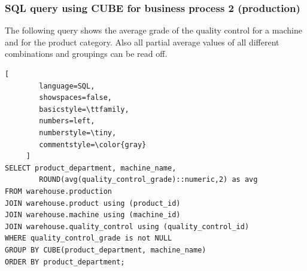 \documentclass[letterpaper,12pt]{article}
\begin{document}
\subsubsection{SQL query using CUBE for business process 2 (production)}

The following query shows the average grade of the quality control for a machine and for the product category. Also all partial average values of all different combinations and groupings can be read off.

\begin{lstlisting}[
        language=SQL,
        showspaces=false,
        basicstyle=\ttfamily,
        numbers=left,
        numberstyle=\tiny,
        commentstyle=\color{gray}
     ]
SELECT product_department, machine_name, 
        ROUND(avg(quality_control_grade)::numeric,2) as avg
FROM warehouse.production
JOIN warehouse.product using (product_id)
JOIN warehouse.machine using (machine_id)
JOIN warehouse.quality_control using (quality_control_id)
WHERE quality_control_grade is not NULL
GROUP BY CUBE(product_department, machine_name)
ORDER BY product_department;	
\end{lstlisting}
\end{document}
